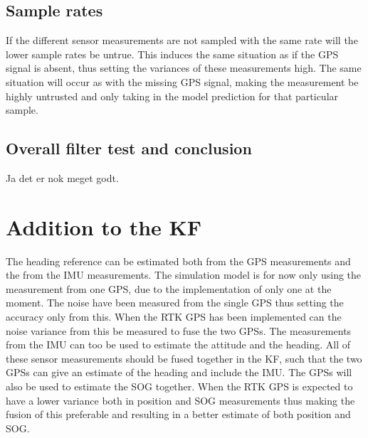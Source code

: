 \subsection{Sample rates}
If the different sensor measurements are not sampled with the same rate will the lower sample rates be untrue. This induces the same situation as if the \ac{GPS} signal is absent, thus setting the variances of these measurements high. The same situation will occur as with the missing \ac{GPS} signal, making the measurement be highly untrusted and only taking in the model prediction for that particular sample.

\subsection{Overall filter test and conclusion}
Ja det er nok meget godt.

\section{Addition to the \acl{KF}}
The heading reference can be estimated both from the \ac{GPS} measurements and the from the \ac{IMU} measurements. The simulation model is for now only using the measurement from one \ac{GPS}, due to the implementation of only one at the moment. The noise have been measured from the single \ac{GPS} thus setting the accuracy only from this. When the \ac{RTK} \ac{GPS} has been implemented can the noise variance from this be measured to fuse the two \ac{GPS}s. The measurements from the \ac{IMU} can too be used to estimate the attitude and the heading. All of these sensor measurements should be fused together in the \ac{KF}, such that the two \ac{GPS}s can give an estimate of the heading and include the \ac{IMU}. The \ac{GPS}s will also be used to estimate the \ac{SOG} together. When the \ac{RTK} \ac{GPS} is expected to have a lower variance both in position and \ac{SOG} measurements thus making the fusion of this preferable and resulting in a better estimate of both position and \ac{SOG}.



